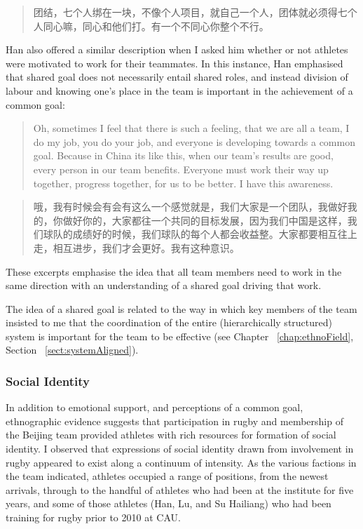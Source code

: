 \begin{CJK}{UTF8}{gbsn}
  \begin{quote}
    团结，七个人绑在一块，不像个人项目，就自己一个人，团体就必须得七个人同心嘛，同心和他们打。有一个不同心你整个不行。
  \end{quote}

  Han also offered a similar description when I asked him whether or not athletes were motivated to work for their teammates. In this instance, Han emphasised that shared goal does not necessarily  entail shared roles, and instead division of labour and knowing one's place in the team is important in the achievement of a common goal:

    \begin{quote}
        Oh, sometimes I feel that there is such a feeling, that we are all a team, I do my job, you do your job, and everyone is developing towards a common goal.  Because in China its like this, when our team’s results are good, every person in our team benefits.  Everyone must work their way up together, progress together, for us to be better. I have this awareness.
    \end{quote}

  \begin{quote}
      	哦，我有时候会有会有这么一个感觉就是，我们大家是一个团队，我做好我的，你做好你的，大家都往一个共同的目标发展，因为我们中国是这样，我们球队的成绩好的时候，我们球队的每个人都会收益整。大家都要相互往上走，相互进步，我们才会更好。我有这种意识。 
  \end{quote}

These excerpts emphasise the idea that all team members need to work in the same direction with an understanding of a shared goal driving that work.

The idea of a shared goal is related to the way in which key members of the team insisted to me that the coordination of the entire (hierarchically structured) system is important for the team to be effective (see Chapter ~\ref{chap:ethnoField}, Section ~\ref{sect:systemAligned}).




\subsubsection{Social Identity\label{sect:socialIdentity}}

In addition to emotional support, and perceptions of a common goal, ethnographic evidence suggests that participation in rugby and membership of the Beijing team provided athletes with rich resources for formation of social identity.  I observed that expressions of social identity drawn from involvement in rugby appeared to exist along a continuum of intensity.  As the various factions in the team indicated, athletes occupied a range of positions, from the newest arrivals, through to the handful of athletes who had been at the institute for five years, and some of those athletes (Han, Lu, and Su Hailiang) who had been training for rugby prior to 2010 at CAU.


\end{CJK}
